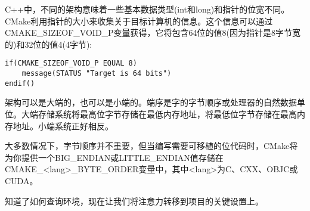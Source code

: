 C++中，不同的架构意味着一些基本数据类型(int和long)和指针的位宽不同。CMake利用指针的大小来收集关于目标计算机的信息。这个信息可以通过CMAKE\_SIZEOF\_VOID\_P变量获得，它将包含64位的值8(因为指针是8字节宽的)和32位的值4(4字节):

\begin{lstlisting}[style=styleCMake]
if(CMAKE_SIZEOF_VOID_P EQUAL 8)
	message(STATUS "Target is 64 bits")
endif()
\end{lstlisting}


架构可以是大端的，也可以是小端的。端序是字的字节顺序或处理器的自然数据单位。大端存储系统将最高位字节存储在最低内存地址，将最低位字节存储在最高内存地址。小端系统正好相反。

大多数情况下，字节顺序并不重要，但当编写需要可移植的位代码时，CMake将为你提供一个BIG\_ENDIAN或LITTLE\_ENDIAN值存储在CMAKE\_<lang>\_BYTE\_ORDER变量中，其中<lang>为C、CXX、OBJC或CUDA。

知道了如何查询环境，现在让我们将注意力转移到项目的关键设置上。

